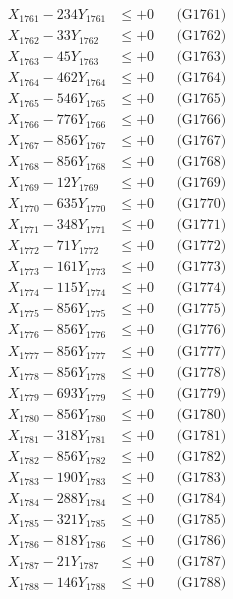 \documentclass[a4paper,10pt]{article}
\begin{document}
{\begin{align}
\allowbreak
X_{1761} - 234Y_{1761} &\leq +0 && \text{(G1761)} \\
X_{1762} - 33Y_{1762} &\leq +0 && \text{(G1762)} \\
X_{1763} - 45Y_{1763} &\leq +0 && \text{(G1763)} \\
X_{1764} - 462Y_{1764} &\leq +0 && \text{(G1764)} \\
X_{1765} - 546Y_{1765} &\leq +0 && \text{(G1765)} \\
X_{1766} - 776Y_{1766} &\leq +0 && \text{(G1766)} \\
X_{1767} - 856Y_{1767} &\leq +0 && \text{(G1767)} \\
X_{1768} - 856Y_{1768} &\leq +0 && \text{(G1768)} \\
X_{1769} - 12Y_{1769} &\leq +0 && \text{(G1769)} \\
X_{1770} - 635Y_{1770} &\leq +0 && \text{(G1770)} \\
\allowbreak
X_{1771} - 348Y_{1771} &\leq +0 && \text{(G1771)} \\
X_{1772} - 71Y_{1772} &\leq +0 && \text{(G1772)} \\
X_{1773} - 161Y_{1773} &\leq +0 && \text{(G1773)} \\
X_{1774} - 115Y_{1774} &\leq +0 && \text{(G1774)} \\
X_{1775} - 856Y_{1775} &\leq +0 && \text{(G1775)} \\
X_{1776} - 856Y_{1776} &\leq +0 && \text{(G1776)} \\
X_{1777} - 856Y_{1777} &\leq +0 && \text{(G1777)} \\
X_{1778} - 856Y_{1778} &\leq +0 && \text{(G1778)} \\
X_{1779} - 693Y_{1779} &\leq +0 && \text{(G1779)} \\
X_{1780} - 856Y_{1780} &\leq +0 && \text{(G1780)} \\
\allowbreak
X_{1781} - 318Y_{1781} &\leq +0 && \text{(G1781)} \\
X_{1782} - 856Y_{1782} &\leq +0 && \text{(G1782)} \\
X_{1783} - 190Y_{1783} &\leq +0 && \text{(G1783)} \\
X_{1784} - 288Y_{1784} &\leq +0 && \text{(G1784)} \\
X_{1785} - 321Y_{1785} &\leq +0 && \text{(G1785)} \\
X_{1786} - 818Y_{1786} &\leq +0 && \text{(G1786)} \\
X_{1787} - 21Y_{1787} &\leq +0 && \text{(G1787)} \\
X_{1788} - 146Y_{1788} &\leq +0 && \text{(G1788)} \\

\end{align}}
\end{document}
